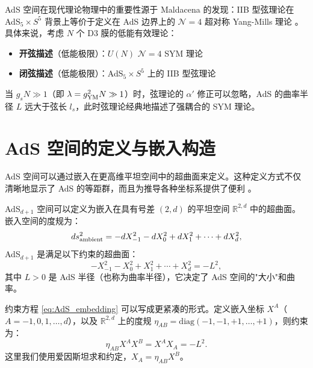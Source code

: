 \begin{remark}
AdS 空间在现代理论物理中的重要性源于 Maldacena 的发现：IIB 型弦理论在 AdS$_5 \times S^5$ 背景上等价于定义在 AdS 边界上的 $\mathcal{N}=4$ 超对称 Yang-Mills 理论 \cite{Maldacena1997}。具体来说，考虑 $N$ 个 D3 膜的低能有效理论：
\begin{itemize}
    \item \textbf{开弦描述}（低能极限）：$U(N)$ $\mathcal{N}=4$ SYM 理论
    \item \textbf{闭弦描述}（低能极限）：AdS$_5 \times S^5$ 上的 IIB 型弦理论
\end{itemize}
当 $g_s N \gg 1$（即 $\lambda = g_{\rm YM}^2 N \gg 1$）时，弦理论的 $\alpha'$ 修正可以忽略，AdS 的曲率半径 $L$ 远大于弦长 $l_s$，此时弦理论经典地描述了强耦合的 SYM 理论。
\end{remark}

\section{AdS 空间的定义与嵌入构造}

AdS 空间可以通过嵌入在更高维平坦空间中的超曲面来定义。这种定义方式不仅清晰地显示了 AdS 的等距群，而且为推导各种坐标系提供了便利 \cite{Aharony1999}。

\begin{definition}
AdS$_{d+1}$ 空间可以定义为嵌入在具有号差 $(2,d)$ 的平坦空间 $\mathbb{R}^{2,d}$ 中的超曲面。嵌入空间的度规为：
\begin{equation}
    ds^2_{\rm ambient} = -dX_{-1}^2 - dX_0^2 + dX_1^2 + \cdots + dX_d^2,
\end{equation}
AdS$_{d+1}$ 是满足以下约束的超曲面：
\begin{equation}
    -X_{-1}^2 - X_0^2 + X_1^2 + \cdots + X_d^2 = -L^2,
    \label{eq:AdS_embedding}
\end{equation}
其中 $L > 0$ 是 AdS 半径（也称为曲率半径），它决定了 AdS 空间的"大小"和曲率。
\end{definition}

\begin{remark}
约束方程 \eqref{eq:AdS_embedding} 可以写成更紧凑的形式。定义嵌入坐标 $X^A$（$A = -1, 0, 1, \ldots, d$），以及 $\mathbb{R}^{2,d}$ 上的度规 $\eta_{AB} = \text{diag}(-1,-1,+1,\ldots,+1)$，则约束为：
\begin{equation}
    \eta_{AB} X^A X^B = X^A X_A = -L^2.
\end{equation}
这里我们使用爱因斯坦求和约定，$X_A = \eta_{AB} X^B$。
\end{remark}

